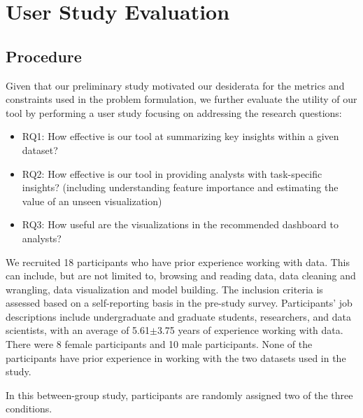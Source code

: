 \section{User Study Evaluation}
\subsection{Procedure}
Given that our preliminary study motivated our desiderata for the metrics and constraints used in the problem formulation, we further evaluate the utility of our tool by performing a user study focusing on addressing the research questions: 
\begin{itemize}
	\item RQ1: How effective is our tool at summarizing key insights within a given dataset?
	\item RQ2: How effective is our tool in providing analysts with task-specific insights? (including understanding feature importance and estimating the value of an unseen visualization)%
	\item RQ3: How useful are the visualizations in the recommended dashboard to analysts?
\end{itemize}
We recruited 18 participants who have prior experience working with data. This can include, but are not limited to, browsing and reading data, data cleaning and wrangling, data visualization and model building. The inclusion criteria is assessed based on a self-reporting basis in the pre-study survey. Participants' job descriptions include undergraduate and graduate students, researchers, and data scientists, with an average of 5.61$\pm$3.75 years of experience working with data. There were 8 female participants and 10 male participants. None of the participants have prior experience in working with the two datasets used in the study.
\par In this between-group study, participants are randomly assigned two of the three conditions. 

